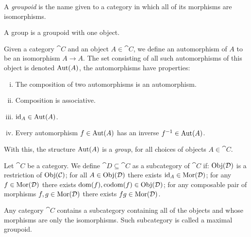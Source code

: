 \begin{definition}[Groupoids]\label{def: groupoids}
  A \emph{groupoid} is the name given to a category in which all of its
  morphisms are isomorphisms.
\end{definition}

\begin{definition}[Group]\label{def: group}
  A group is a groupoid with one object.
\end{definition}

\begin{definition}[Automorphism]
  Given a category \(\cat C\) and an object  \(A \in \cat C\), we define an
  automorphism of \(A\) to be an isomorphism \(A \to A\). The set consisting of
  all such automorphisms of this object is denoted \(\operatorname{Aut}(A)\), the
  automorphisms have properties:
  \begin{enumerate}[i.]
    \item The composition of two automorphisms is an automorphism.
    \item Composition is associative.
    \item \(\operatorname{id}_A \in \operatorname{Aut}(A)\).
    \item Every automorphism \(f \in \operatorname{Aut}(A)\) has an inverse \(f^{-1}
       \in \operatorname{Aut}(A)\).
  \end{enumerate}
  With this, the structure \(\operatorname{Aut}(A)\) is a \emph{group}, for all choices of
  objects \(A \in \cat{C}\).
\end{definition}

\begin{definition}[Subcategory]\label{def: subcategory}
  Let \(\cat C\) be a category. We define \(\cat D \subseteq \cat C\) as a
  subcategory of \(\cat C\) if: \(\operatorname{Obj}(\mathcal D)\) is a restriction of \(\operatorname{Obj}(\mathcal
  C)\); for all \(A \in \operatorname{Obj}(\mathcal D)\) there exists \(\operatorname{id}_A \in \operatorname{Mor}(\mathcal D)\);
  for any \(f \in \operatorname{Mor}(\mathcal D)\) there exists \(\operatorname{dom}(f), \operatorname{codom}(f) \in
  \operatorname{Obj}(\mathcal D)\); for any composable pair of morphisms \(f, g \in \operatorname{Mor}(\mathcal D)\)
  there exists \(f g \in \operatorname{Mor}(\mathcal D)\).
\end{definition}

\begin{lemma}
  Any category \(\cat C\) contains a subcategory containing all of the objects
  and whose morphisms are only the isomorphisms. Such subcategory is called a
  maximal groupoid.
\end{lemma}

